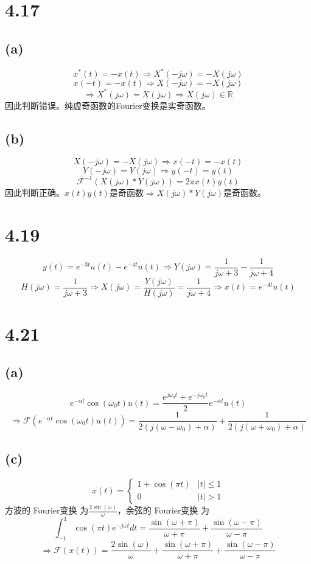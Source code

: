 \documentclass[UTF8,fontset=fandol,12pt,a4paper]{ctexart}
\begin{document}
\section*{4.17}
\subsection*{(a)}
\[x^*(t)=-x(t)\Rightarrow X^*(-j\omega)=-X(j\omega)\]
\[x(-t)=-x(t)\Rightarrow X(-j\omega)=-X(j\omega)\]
\[\Longrightarrow X^*(j\omega)=X(j\omega)\Longrightarrow X(j\omega)\in\mathbb{R}\]
因此判断错误。纯虚奇函数的Fourier变换是实奇函数。
\subsection*{(b)}
\[X(-j\omega)=-X(j\omega) \Rightarrow x(-t)=-x(t)\]
\[Y(-j\omega)=Y(j\omega) \Rightarrow y(-t)=y(t)\]
\[\mathcal{F}^{-1}(X(j\omega)*Y(j\omega))=2\pi x(t)y(t)\]因此判断正确。$x(t)y(t)$是奇函数$\Rightarrow X(j\omega)*Y(j\omega)$是奇函数。

\section*{4.19}
\[y(t)=e^{-3t}u(t)-e^{-4t}u(t)\Rightarrow Y(j\omega)=\frac{1}{j\omega+3}-\frac{1}{j\omega+4}\]
\[H(j\omega)=\frac{1}{j\omega+3}\Rightarrow X(j\omega)=\frac{Y(j\omega)}{H(j\omega)}=\frac{1}{j\omega+4}\Rightarrow x(t)=e^{-4t}u(t)\]

\section*{4.21}
\subsection*{(a)}
\[e^{-\alpha t}\cos{(\omega_0 t)}u(t)=\frac{e^{j\omega_0 t}+e^{-j\omega_0 t}}{2}e^{-\alpha t}u(t)\]
\[\Longrightarrow \mathcal{F}(e^{-\alpha t}\cos{(\omega_0 t)}u(t))=\frac{1}{2(j(\omega-\omega_0)+\alpha)}+\frac{1}{2(j(\omega+\omega_0)+\alpha)}\]
\subsection*{(c)}
\[x(t)=\begin{cases}
  1+\cos{(\pi t)} &|t|\le 1 \\
  0 &|t|>1
\end{cases}\]
方波的 Fourier变换 为$\frac{2\sin{(\omega)}}{\omega}$，余弦的 Fourier变换 为 \\
$$\int_{-1}^{1}\cos{(\pi t)}e^{-j\omega t}dt=\frac{\sin{(\omega+\pi)}}{\omega+\pi}+\frac{\sin{(\omega-\pi)}}{\omega-\pi}$$
\[\Longrightarrow \mathcal{F}(x(t))=\frac{2\sin{(\omega)}}{\omega}+\frac{\sin{(\omega+\pi)}}{\omega+\pi}+\frac{\sin{(\omega-\pi)}}{\omega-\pi}\]
\end{document}
